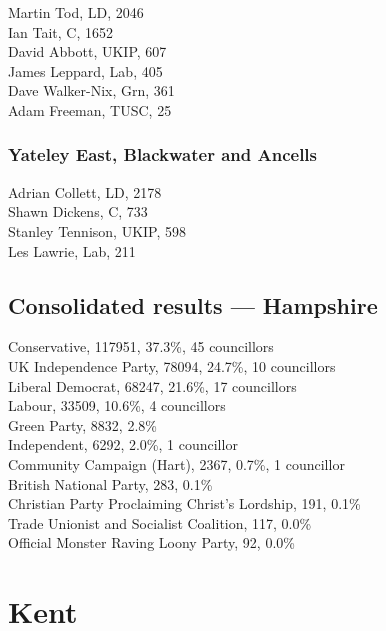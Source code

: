 \documentclass[a4paper,openany,10pt]{book}
\begin{document}


Martin Tod, LD, 2046\\
Ian Tait, C, 1652\\
David Abbott, UKIP, 607\\
James Leppard, Lab, 405\\
Dave Walker-Nix, Grn, 361\\
Adam Freeman, TUSC, 25\\


\subsubsection*{Yateley East, Blackwater and Ancells}



Adrian Collett, LD, 2178\\
Shawn Dickens, C, 733\\
Stanley Tennison, UKIP, 598\\
Les Lawrie, Lab, 211\\




\subsection*{Consolidated results --- Hampshire}
Conservative, 117951, 37.3\%, 45 councillors\\
UK Independence Party, 78094, 24.7\%, 10 councillors\\
Liberal Democrat, 68247, 21.6\%, 17 councillors\\
Labour, 33509, 10.6\%, 4 councillors\\
Green Party, 8832, 2.8\% \\
Independent, 6292, 2.0\%, 1 councillor\\
Community Campaign (Hart), 2367, 0.7\%, 1 councillor\\
British National Party, 283, 0.1\% \\
Christian Party Proclaiming Christ's Lordship, 191, 0.1\% \\
Trade Unionist and Socialist Coalition, 117, 0.0\% \\
Official Monster Raving Loony Party, 92, 0.0\% \\


\vfill

\section{Kent}
\end{document}
